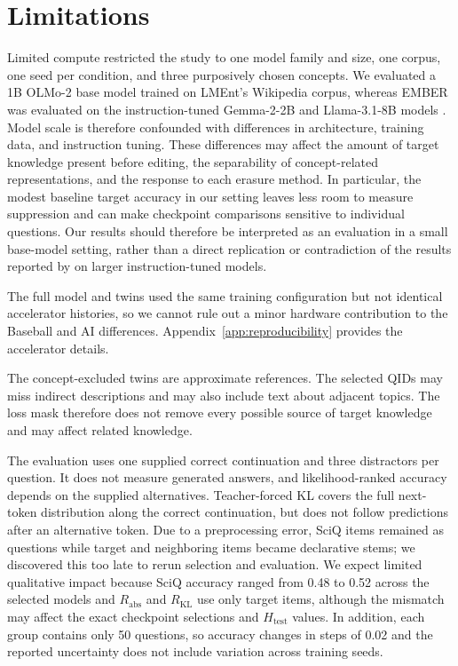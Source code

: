 \section{Limitations}
\label{sec:limitations}

Limited compute restricted the study to one model family and size, one corpus,
one seed per condition, and three purposively chosen concepts. We evaluated a
1B OLMo-2 base model trained on LMEnt's Wikipedia corpus, whereas EMBER was
evaluated on the instruction-tuned Gemma-2-2B and Llama-3.1-8B models
\citep{suslik2026ember}. Model scale is therefore confounded with differences
in architecture, training data, and instruction tuning. These differences may
affect the amount of target knowledge present before editing, the separability
of concept-related representations, and the response to each erasure method.
In particular, the modest baseline target accuracy in our setting leaves less
room to measure suppression and can make checkpoint comparisons sensitive to
individual questions. Our results should therefore be interpreted as an evaluation in a small
base-model setting, rather than a direct replication or contradiction of
the results reported by \citet{suslik2026ember} on larger instruction-tuned
models.

The full model and twins used the same training configuration but not identical
accelerator histories, so we cannot rule out a minor hardware contribution to
the Baseball and AI differences. Appendix~\ref{app:reproducibility} provides
the accelerator details.

The concept-excluded twins are approximate references. The selected QIDs may
miss indirect descriptions and may also include text about adjacent topics.
The loss mask therefore does not remove every possible source of target
knowledge and may affect related knowledge.

The evaluation uses one supplied correct continuation and three distractors
per question. It does not measure generated answers, and likelihood-ranked
accuracy depends on the supplied alternatives. Teacher-forced KL covers the
full next-token distribution along the correct continuation, but does not
follow predictions after an alternative token. Due to a preprocessing error,
SciQ items remained as questions while target and neighboring items became
declarative stems; we discovered this too late to rerun selection and
evaluation. We expect limited qualitative impact because SciQ accuracy ranged
from 0.48 to 0.52 across the selected models and $R_{\mathrm{abs}}$ and
$R_{\mathrm{KL}}$ use only target items, although the mismatch may affect the
exact checkpoint selections and $H_{\mathrm{test}}$ values. In addition, each
group contains only 50 questions, so accuracy changes in steps of 0.02 and the
reported uncertainty does not include variation across training seeds.

